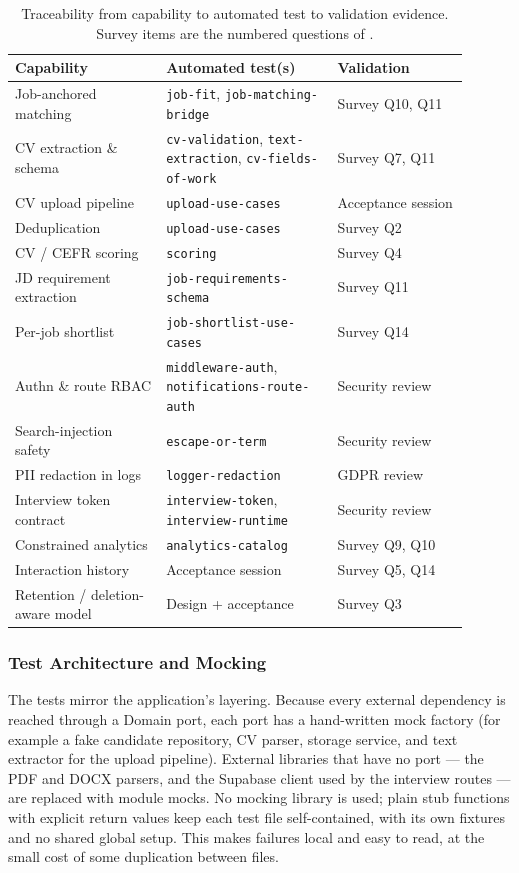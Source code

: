 \begin{table}[H]
\centering
\caption[Requirements traceability matrix]{Traceability from capability to
automated test to validation evidence. Survey items are the numbered
questions of .}
\label{tab:traceability}
\small
\begin{tabular}{p{0.30\linewidth}p{0.34\linewidth}p{0.26\linewidth}}
\toprule
\textbf{Capability} & \textbf{Automated test(s)} & \textbf{Validation} \\
\midrule
Job-anchored matching & \texttt{job-fit}, \texttt{job-matching-bridge} & Survey Q10, Q11 \\
CV extraction \& schema & \texttt{cv-validation}, \texttt{text-extraction}, \texttt{cv-fields-of-work} & Survey Q7, Q11 \\
CV upload pipeline & \texttt{upload-use-cases} & Acceptance session \\
Deduplication & \texttt{upload-use-cases} & Survey Q2 \\
CV / CEFR scoring & \texttt{scoring} & Survey Q4 \\
JD requirement extraction & \texttt{job-requirements-schema} & Survey Q11 \\
Per-job shortlist & \texttt{job-shortlist-use-cases} & Survey Q14 \\
Authn \& route RBAC & \texttt{middleware-auth}, \texttt{notifications-route-auth} & Security review \\
Search-injection safety & \texttt{escape-or-term} & Security review \\
PII redaction in logs & \texttt{logger-redaction} & GDPR review \\
Interview token contract & \texttt{interview-token}, \texttt{interview-runtime} & Security review \\
Constrained analytics & \texttt{analytics-catalog} & Survey Q9, Q10 \\
Interaction history & Acceptance session & Survey Q5, Q14 \\
Retention / deletion-aware model & Design + acceptance & Survey Q3 \\
\bottomrule
\end{tabular}
\end{table}

\subsubsection{Test Architecture and Mocking}

The tests mirror the application's layering. Because every external
dependency is reached through a Domain port, each port has a hand-written
mock factory (for example a fake candidate repository, CV parser, storage
service, and text extractor for the upload pipeline). External libraries
that have no port --- the PDF and DOCX parsers, and the Supabase client used
by the interview routes --- are replaced with module mocks. No mocking
library is used; plain stub functions with explicit return values keep each
test file self-contained, with its own fixtures and no shared global setup.
This makes failures local and easy to read, at the small cost of some
duplication between files.

